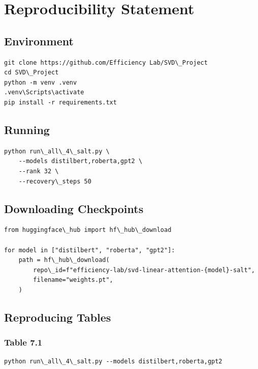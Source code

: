 
\section{Reproducibility Statement}

\subsection{Environment}

\begin{lstlisting}
git clone https://github.com/Efficiency Lab/SVD\_Project
cd SVD\_Project
python -m venv .venv
.venv\Scripts\activate
pip install -r requirements.txt
\end{lstlisting}

\subsection{Running}

\begin{lstlisting}
python run\_all\_4\_salt.py \
    --models distilbert,roberta,gpt2 \
    --rank 32 \
    --recovery\_steps 50
\end{lstlisting}

\subsection{Downloading Checkpoints}

\begin{lstlisting}
from huggingface\_hub import hf\_hub\_download

for model in ["distilbert", "roberta", "gpt2"]:
    path = hf\_hub\_download(
        repo\_id=f"efficiency-lab/svd-linear-attention-{model}-salt",
        filename="weights.pt",
    )
\end{lstlisting}

\subsection{Reproducing Tables}

\subsubsection{Table 7.1}

\begin{lstlisting}
python run\_all\_4\_salt.py --models distilbert,roberta,gpt2
\end{lstlisting}

